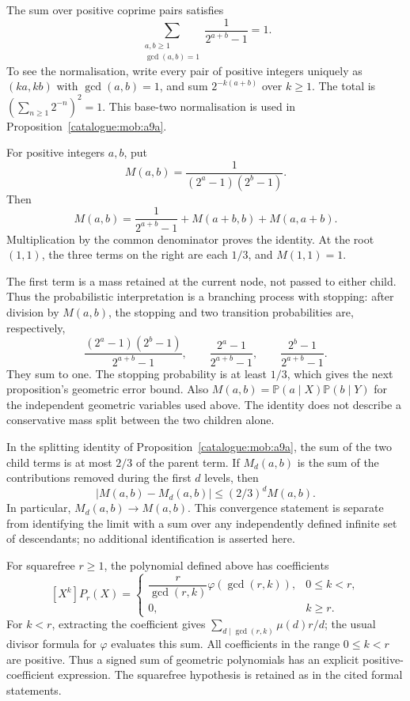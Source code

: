 \begin{prop}\label{catalogue:mob:a8}
The sum over positive coprime pairs satisfies
\[
 \sum_{\substack{a,b\ge1\\\gcd(a,b)=1}}
                  \frac1{2^{a+b}-1}=1.
\]
To see the normalisation, write every pair of positive integers uniquely
as $(ka,kb)$ with $\gcd(a,b)=1$, and sum $2^{-k(a+b)}$ over $k\ge1$.
The total is $(\sum_{n\ge1}2^{-n})^2=1$. This base-two normalisation
is used in Proposition~\ref{catalogue:mob:a9a}.
\end{prop}

\begin{prop}\label{catalogue:mob:a9a}
For positive integers $a,b$, put
\[
 M(a,b)=\frac1{(2^a-1)(2^b-1)}.
\]
Then
\[
 M(a,b)=\frac1{2^{a+b}-1}+M(a+b,b)+M(a,a+b).
\]
Multiplication by the common denominator proves the identity. At the
root $(1,1)$, the three terms on the right are each $1/3$, and
$M(1,1)=1$.

The first term is a mass retained at the current node, not passed to
either child. Thus the probabilistic interpretation is a branching
process with stopping: after division by $M(a,b)$, the stopping and two
transition probabilities are, respectively,
\[
 \frac{(2^a-1)(2^b-1)}{2^{a+b}-1},\qquad
 \frac{2^a-1}{2^{a+b}-1},\qquad
 \frac{2^b-1}{2^{a+b}-1}.
\]
They sum to one. The stopping probability is at least $1/3$, which gives
the next proposition's geometric error bound. Also
$M(a,b)=\mathbb P(a\mid X)\mathbb P(b\mid Y)$ for the independent
geometric variables used above. The identity does not describe a
conservative mass split between the two children alone.
\end{prop}

\begin{prop}\label{catalogue:mob:a9b}
In the splitting identity of Proposition~\ref{catalogue:mob:a9a}, the
sum of the two child terms is at most $2/3$ of the parent term.
If $M_d(a,b)$ is the sum of the contributions removed during the first
$d$ levels, then
\[
 |M(a,b)-M_d(a,b)|\le(2/3)^d M(a,b).
\]
In particular, $M_d(a,b)\to M(a,b)$. This convergence statement is
separate from identifying the limit with a sum over any independently
defined infinite set of descendants; no additional identification is
asserted here.
\end{prop}

\begin{prop}\label{catalogue:mob:b1}
For squarefree $r\ge1$, the polynomial defined above has coefficients
\[
 [X^k]P_r(X)=
 \begin{cases}
 \dfrac r{\gcd(r,k)}\varphi(\gcd(r,k)),&0\le k<r,\\
 0,&k\ge r.
 \end{cases}
\]
For $k<r$, extracting the coefficient gives
$\sum_{d\mid\gcd(r,k)}\mu(d)r/d$; the usual divisor formula for
$\varphi$ evaluates this sum. All coefficients in the range $0\le k<r$
are positive. Thus a signed sum of geometric polynomials has an explicit
positive-coefficient expression. The squarefree hypothesis is retained
as in the cited formal statements.
\end{prop}

